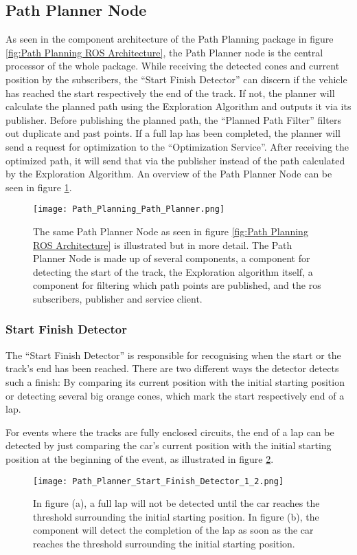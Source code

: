 \subsection{Path Planner Node} \label{sec:Path Planner Node}
As seen in the component architecture of the Path Planning package in figure \ref{fig:Path Planning ROS Architecture}, the Path Planner node is the central processor of the whole package.
While receiving the detected cones and current position by the subscribers, the ``Start Finish Detector'' can discern if the vehicle has reached the start respectively the end of the track. If not, the planner will calculate the planned path using the Exploration Algorithm and outputs it via its publisher. Before publishing the planned path, the ``Planned Path Filter'' filters out duplicate and past points. If a full lap has been completed, the planner will send a request for optimization to the ``Optimization Service''. After receiving the optimized path, it will send that via the publisher instead of the path calculated by the Exploration Algorithm. An overview of the Path Planner Node can be seen in figure \ref{fig:Path Planning Path Planner Node}.
\begin{figure}[H]
    \centering
    \texttt{[image: Path\_Planning\_Path\_Planner.png]}
    \caption{The same Path Planner Node as seen in figure \ref{fig:Path Planning ROS Architecture} is illustrated but in more detail. The Path Planner Node is made up of several components, a component for detecting the start of the track, the Exploration algorithm itself, a component for filtering which path points are published, and the \acrshort{ros} subscribers, publisher and service client.}
    \label{fig:Path Planning Path Planner Node}
\end{figure}

\subsubsection{Start Finish Detector} \label{sec:Start Finish Detector}
The ``Start Finish Detector'' is responsible for recognising when the start or the track's end has been reached. There are two different ways the detector detects such a finish: By comparing its current position with the initial starting position or detecting several big orange cones, which mark the start respectively end of a lap.

For events where the tracks are fully enclosed circuits, the end of a lap can be detected by just comparing the car's current position with the initial starting position at the beginning of the event, as illustrated in figure \ref{fig:Path Planner Start Finish Detector 1 and 2}.
\begin{figure}[H]
    \centering
    \texttt{[image: Path\_Planner\_Start\_Finish\_Detector\_1\_2.png]}
    \caption{In figure (a), a full lap will not be detected until the car reaches the threshold surrounding the initial starting position. In figure (b), the component will detect the completion of the lap as soon as the car reaches the threshold surrounding the initial starting position.}
    \label{fig:Path Planner Start Finish Detector 1 and 2}
\end{figure}

